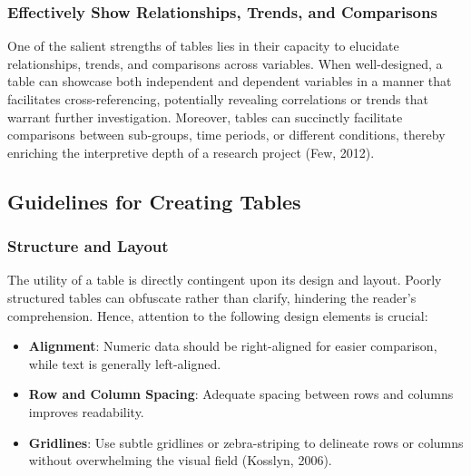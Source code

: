 \documentclass[
  b5paper]{book}
\providecommand{\tightlist}{%
  \setlength{\itemsep}{0pt}\setlength{\parskip}{0pt}}
\begin{document}
\hypertarget{effectively-show-relationships-trends-and-comparisons}{%
\subsubsection*{Effectively Show Relationships, Trends, and Comparisons}\label{effectively-show-relationships-trends-and-comparisons}}

One of the salient strengths of tables lies in their capacity to elucidate relationships, trends, and comparisons across variables. When well-designed, a table can showcase both independent and dependent variables in a manner that facilitates cross-referencing, potentially revealing correlations or trends that warrant further investigation. Moreover, tables can succinctly facilitate comparisons between sub-groups, time periods, or different conditions, thereby enriching the interpretive depth of a research project (Few, 2012).

\hypertarget{guidelines-for-creating-tables}{%
\subsection*{Guidelines for Creating Tables}\label{guidelines-for-creating-tables}}

\hypertarget{structure-and-layout}{%
\subsubsection*{Structure and Layout}\label{structure-and-layout}}

The utility of a table is directly contingent upon its design and layout. Poorly structured tables can obfuscate rather than clarify, hindering the reader's comprehension. Hence, attention to the following design elements is crucial:

\begin{itemize}
\tightlist
\item
  \textbf{Alignment}: Numeric data should be right-aligned for easier comparison, while text is generally left-aligned.
\item
  \textbf{Row and Column Spacing}: Adequate spacing between rows and columns improves readability.
\item
  \textbf{Gridlines}: Use subtle gridlines or zebra-striping to delineate rows or columns without overwhelming the visual field (Kosslyn, 2006).
\end{itemize}
\end{document}
